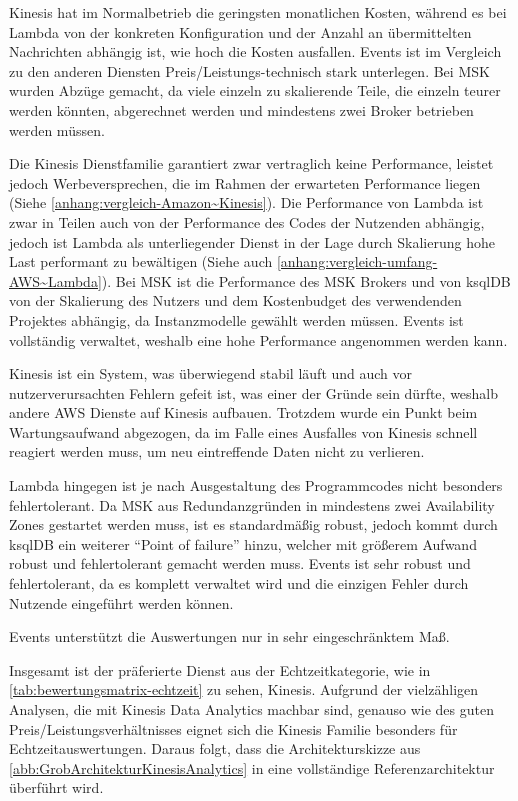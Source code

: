 Kinesis hat im Normalbetrieb die geringsten monatlichen Kosten, während es bei Lambda von der konkreten Konfiguration und der Anzahl an übermittelten Nachrichten abhängig ist, wie hoch die Kosten ausfallen. \AWSIOT{} Events ist im Vergleich zu den anderen Diensten Preis/Leistungs-technisch stark unterlegen. Bei \ac{MSK} wurden Abzüge gemacht, da viele einzeln zu skalierende Teile, die einzeln teurer werden könnten, abgerechnet werden und mindestens zwei Broker betrieben werden müssen.

Die Kinesis Dienstfamilie garantiert zwar vertraglich keine Performance, leistet jedoch Werbeversprechen, die im Rahmen der erwarteten Performance liegen (Siehe \ref{anhang:vergleich-Amazon~Kinesis}). Die Performance von Lambda ist zwar in Teilen auch von der Performance des Codes der Nutzenden abhängig, jedoch ist Lambda als unterliegender Dienst in der Lage durch Skalierung hohe Last performant zu bewältigen (Siehe auch \ref{anhang:vergleich-umfang-AWS~Lambda}). Bei \ac{MSK} ist die Performance des \ac{MSK} Brokers und von ksqlDB von der Skalierung des Nutzers und dem Kostenbudget des verwendenden Projektes abhängig, da Instanzmodelle gewählt werden müssen. \AWSIOT{} Events ist vollständig verwaltet, weshalb eine hohe Performance angenommen werden kann.

Kinesis ist ein System, was überwiegend stabil läuft und auch vor nutzerverursachten Fehlern gefeit ist, was einer der Gründe sein dürfte, weshalb andere \ac{AWS} Dienste auf Kinesis aufbauen. Trotzdem wurde ein Punkt beim Wartungsaufwand abgezogen, da im Falle eines Ausfalles von Kinesis schnell reagiert werden muss, um neu eintreffende Daten nicht zu verlieren.

Lambda hingegen ist je nach Ausgestaltung des Programmcodes nicht besonders fehlertolerant. Da \ac{MSK} aus Redundanzgründen in mindestens zwei Availability Zones gestartet werden muss, ist es standardmäßig robust, jedoch kommt durch ksqlDB ein weiterer \enquote{Point of failure} hinzu, welcher mit größerem Aufwand robust und fehlertolerant gemacht werden muss. \AWSIOT{} Events ist sehr robust und fehlertolerant, da es komplett verwaltet wird und die einzigen Fehler durch Nutzende eingeführt werden können.

\AWSIOT{} Events unterstützt die Auswertungen nur in sehr eingeschränktem Maß.

Insgesamt ist der präferierte Dienst aus der Echtzeitkategorie, wie in \autoref{tab:bewertungsmatrix-echtzeit} zu sehen, Kinesis. Aufgrund der vielzähligen Analysen, die mit Kinesis Data Analytics machbar sind, genauso wie des guten Preis/Leistungsverhältnisses eignet sich die Kinesis Familie besonders für Echtzeitauswertungen. Daraus folgt, dass die Architekturskizze aus \autoref{abb:GrobArchitekturKinesisAnalytics} in eine vollständige Referenzarchitektur überführt wird.



